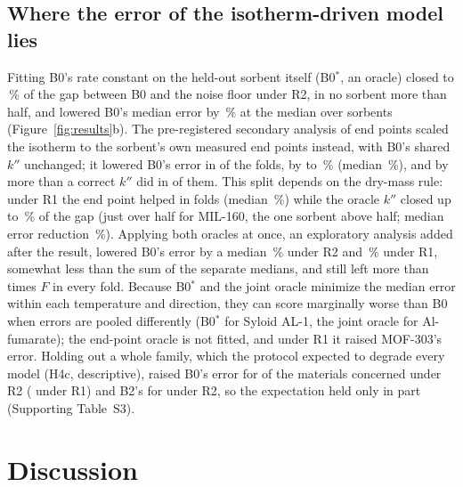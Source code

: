 \documentclass[12pt]{article}
\newcommand{\kpp}{k''}
\begin{document}
\subsection{Where the error of the isotherm-driven model lies}\label{sec:error}

Fitting B0's rate constant on the held-out sorbent itself (B0$^{*}$, an oracle) closed  to
\,\% of the gap between B0 and the noise floor under R2, in no sorbent more than half, and lowered
B0's median error by \,\% at the median over sorbents (Figure~\ref{fig:results}b). The
pre-registered secondary analysis of end points scaled the isotherm to the sorbent's own measured end points instead,
with B0's shared $\kpp$ unchanged; it lowered B0's error in  of the  folds, by
 to \,\% (median \,\%), and by more than a correct $\kpp$ did in
 of them. This split depends on the dry-mass rule: under R1 the end point helped in
 folds (median \,\%) while the oracle $\kpp$ closed up to
\,\% of the gap (just over half for MIL-160, the one sorbent above half; median error reduction
\,\%). Applying both oracles at
once, an exploratory analysis added after the result, lowered B0's error by a median \,\% under R2
and \,\% under R1, somewhat less than the sum of the separate medians, and still left more than
 times $F$ in every fold. Because B0$^{*}$ and the joint oracle minimize the median error within each
temperature and direction, they can score marginally worse than B0 when errors are pooled differently (B0$^{*}$ for
Syloid AL-1, the joint oracle for Al-fumarate); the end-point oracle is not fitted, and under R1 it raised MOF-303's
error. Holding out
a whole family, which the protocol expected to degrade every model (H4c, descriptive), raised B0's error for
 of the  materials concerned under R2 ( under R1) and B2's for
 under R2, so the expectation held only in part (Supporting Table~S3).








\section{Discussion}
\end{document}
